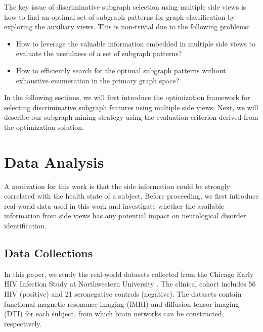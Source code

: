 \documentclass[conference]{IEEEtran}
\begin{document}
The key issue of discriminative subgraph selection using multiple side views is how to find an optimal set of subgraph patterns for graph classification by exploring the auxiliary views. This is non-trivial due to the following problems:
\begin{itemize}
\item How to leverage the valuable information embedded in multiple side views to evaluate the usefulness of a set of subgraph patterns?
\item How to efficiently search for the optimal subgraph patterns without exhaustive enumeration in the primary graph space?
\end{itemize}

In the following sections, we will first introduce the optimization framework for selecting discriminative subgraph features using multiple side views. Next, we will describe our subgraph mining strategy using the evaluation criterion derived from the optimization solution.

\section{Data Analysis}\label{sec:data}

A motivation for this work is that the side information could be strongly correlated with the health state of a subject. Before proceeding, we first introduce real-world data used in this work and investigate whether the available information from side views has any potential impact on neurological disorder identification.

\subsection{Data Collections}\label{sec:dataset}

In this paper, we study the real-world datasets collected from the Chicago Early HIV Infection Study at Northwestern University \cite{ragin2012structural}. The clinical cohort includes 56 HIV (positive) and 21 seronegative controls (negative). The datasets contain functional magnetic resonance imaging (fMRI) and diffusion tensor imaging (DTI) for each subject, from which brain networks can be constructed, respectively.
\end{document}
